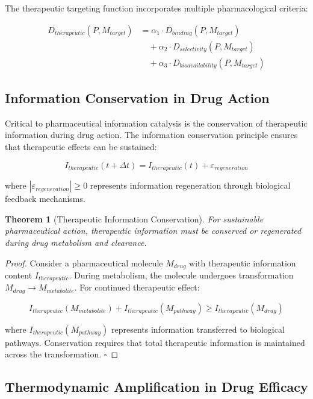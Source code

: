 \documentclass[12pt,a4paper]{article}
\newtheorem{theorem}{Theorem}[section]
\begin{document}
The therapeutic targeting function incorporates multiple pharmacological criteria:

\begin{align}
D_{therapeutic}(P, M_{target}) &= \alpha_1 \cdot D_{binding}(P, M_{target}) \\
&\quad + \alpha_2 \cdot D_{selectivity}(P, M_{target}) \\
&\quad + \alpha_3 \cdot D_{bioavailability}(P, M_{target})
\end{align}

\subsection{Information Conservation in Drug Action}

Critical to pharmaceutical information catalysis is the conservation of therapeutic information during drug action. The information conservation principle ensures that therapeutic effects can be sustained:

\begin{equation}
I_{therapeutic}(t + \Delta t) = I_{therapeutic}(t) + \varepsilon_{regeneration}
\end{equation}

where $|\varepsilon_{regeneration}| \geq 0$ represents information regeneration through biological feedback mechanisms.

\begin{theorem}[Therapeutic Information Conservation]
For sustainable pharmaceutical action, therapeutic information must be conserved or regenerated during drug metabolism and clearance.
\end{theorem}

\begin{proof}
Consider a pharmaceutical molecule $M_{drug}$ with therapeutic information content $I_{therapeutic}$. During metabolism, the molecule undergoes transformation $M_{drug} \rightarrow M_{metabolite}$. For continued therapeutic effect:

$$I_{therapeutic}(M_{metabolite}) + I_{therapeutic}(M_{pathway}) \geq I_{therapeutic}(M_{drug})$$

where $I_{therapeutic}(M_{pathway})$ represents information transferred to biological pathways. Conservation requires that total therapeutic information is maintained across the transformation. $\square$
\end{proof}

\subsection{Thermodynamic Amplification in Drug Efficacy}
\end{document}

